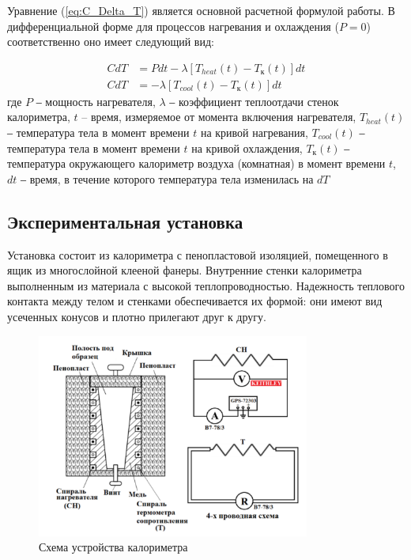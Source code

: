 \documentclass[a4paper, 12pt]{article}
\begin{document}
        Уравнение (\ref{eq:C_Delta_T}) является основной расчетной формулой работы. В дифференциальной форме для процессов нагревания и охлаждения ($P = 0$) соответственно оно имеет следующий вид:

        \begin{align}
            C dT &= P dt - \lambda \left[ T_{heat}(t) - T_к(t) \right] dt \label{eq:CdT} \\
            C dT &= - \lambda \left[ T_{cool}(t) - T_к(t) \right] dt \label{eq:CdT2}
        \end{align}
        где $P$ ‒ мощность нагревателя, $\lambda$ ‒ коэффициент теплоотдачи стенок калориметра, $t$ – время, измеряемое от момента включения нагревателя, $T_{heat}(t)$ ‒ температура тела в момент времени $t$ на кривой нагревания, $T_{cool}(t)$ ‒ температура тела в момент времени $t$ на кривой охлаждения, $T_к(t)$ ‒ температура окружающего калориметр воздуха (комнатная) в момент времени $t$, $dt$ ‒ время, в течение которого температура тела изменилась на $dT$

        \subsection{Экспериментальная установка}

            Установка состоит из калориметра с пенопластовой изоляцией, помещенного в ящик из многослойной клееной фанеры. Внутренние стенки калориметра выполненным из материала с высокой теплопроводностью. Надежность теплового контакта между телом и стенками обеспечивается их формой: они имеют вид усеченных конусов и плотно прилегают друг к другу.

            \begin{figure}[ht]
                \centering
                \includegraphics[width=0.8\textwidth]{img/calorimeter.png}
                \caption{Схема устройства калориметра}
                \label{fig:calorimeter}
            \end{figure}
\end{document}
